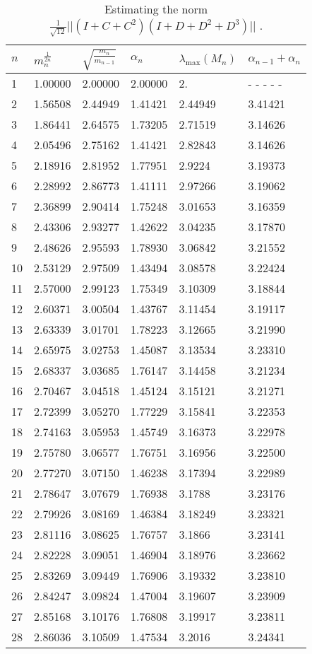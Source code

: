 \documentclass{amsart}
\theoremstyle{definition}
\begin{document}
\begin{table}[b]
\begin{tabular}{llllll}
\hline
$n$ &  $m_n^{\frac1{2n}}$ & $\sqrt{\frac{m_{n}}{m_{n-1}}}$& $\alpha_n$ & $\lambda_{\mathrm{max}}(M_n)$ & $\alpha_{n-1}+\alpha_n$\\
\hline
1 & 1.00000 & 2.00000 & 2.00000 & 2. & - - - - -\\
2 & 1.56508 & 2.44949 & 1.41421 & 2.44949 & 3.41421\\
3 & 1.86441 & 2.64575 & 1.73205 & 2.71519 & 3.14626\\
4 & 2.05496 & 2.75162 & 1.41421 & 2.82843 & 3.14626\\
5 & 2.18916 & 2.81952 & 1.77951 & 2.9224 & 3.19373\\
6 & 2.28992 & 2.86773 & 1.41111 & 2.97266 & 3.19062\\
7 & 2.36899 & 2.90414 & 1.75248 & 3.01653 & 3.16359\\
8 & 2.43306 & 2.93277 & 1.42622 & 3.04235 & 3.17870\\
9 & 2.48626 & 2.95593 & 1.78930 & 3.06842 & 3.21552\\
10 & 2.53129 & 2.97509 & 1.43494 & 3.08578 & 3.22424\\
11 & 2.57000 & 2.99123 & 1.75349 & 3.10309 & 3.18844\\
12 & 2.60371 & 3.00504 & 1.43767 & 3.11454 & 3.19117\\
13 & 2.63339 & 3.01701 & 1.78223 & 3.12665 & 3.21990\\
14 & 2.65975 & 3.02753 & 1.45087 & 3.13534 & 3.23310\\
15 & 2.68337 & 3.03685 & 1.76147 & 3.14458 & 3.21234\\
16 & 2.70467 & 3.04518 & 1.45124 & 3.15121 & 3.21271\\
17 & 2.72399 & 3.05270 & 1.77229 & 3.15841 & 3.22353\\
18 & 2.74163 & 3.05953 & 1.45749 & 3.16373 & 3.22978\\
19 & 2.75780 & 3.06577 & 1.76751 & 3.16956 & 3.22500\\
20 & 2.77270 & 3.07150 & 1.46238 & 3.17394 & 3.22989\\
21 & 2.78647 & 3.07679 & 1.76938 & 3.1788 & 3.23176\\
22 & 2.79926 & 3.08169 & 1.46384 & 3.18249 & 3.23321\\
23 & 2.81116 & 3.08625 & 1.76757 & 3.1866 & 3.23141\\
24 & 2.82228 & 3.09051 & 1.46904 & 3.18976 & 3.23662\\
25 & 2.83269 & 3.09449 & 1.76906 & 3.19332 & 3.23810\\
26 & 2.84247 & 3.09824 & 1.47004 & 3.19607 & 3.23909\\
27 & 2.85168 & 3.10176 & 1.76808 & 3.19917 & 3.23811\\
28 & 2.86036 & 3.10509 & 1.47534 & 3.2016 & 3.24341\\\hline
\end{tabular}
\caption{ Estimating the norm $\frac1{\sqrt{12}}||(I+C+C^2)(I+D+D^2+D^3)||$ .}
\label{t:rootsRationsAlphasNorms}
\end{table}
\end{document}

